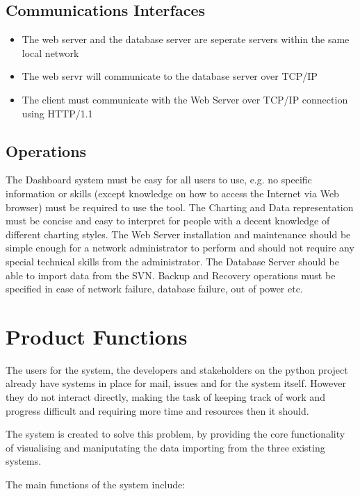 \subsection{Communications Interfaces}
	\begin{itemize}
		\item The web server and the database server are seperate servers within the same local network
		\item The web servr will communicate to the database server over TCP/IP
		\item The client must communicate with the Web Server over TCP/IP connection using HTTP/1.1
	\end{itemize}

\subsection{Operations}
The Dashboard system must be easy for all users to use, e.g. no specific information or skills (except knowledge on how to access the Internet via Web browser) must be required to use the tool.
The Charting and Data representation must be concise and easy to interpret for people with a decent knowledge of different charting styles.
The Web Server installation and maintenance should be simple enough for a network administrator to perform and should not require any special technical skills from the administrator.
The Database Server should be able to import data from the SVN. Backup and Recovery operations must be specified in case of network failure, database failure, out of power etc.


\section{Product Functions}

The users for the system, the developers and stakeholders on the python project already have systems in place for mail, issues and for the system itself. However they do not interact directly, making the task of keeping track of work and progress difficult and requiring more time and resources then it should. 

The system is created to solve this problem, by providing the core functionality of visualising and maniputating the data importing from the three existing systems.

The main functions of the system include:

